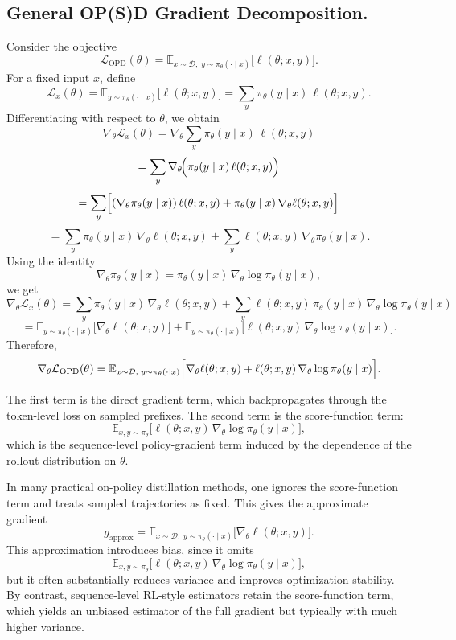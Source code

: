 \subsection{General OP(S)D Gradient Decomposition.} 
Consider the objective
\[
\mathcal{L}_{\mathrm{OPD}}(\theta)
=
\mathbb{E}_{x\sim \mathcal{D},\; y\sim \pi_\theta(\cdot\mid x)}
\bigl[\ell(\theta; x,y)\bigr].
\]
For a fixed input \(x\), define
\[
\mathcal{L}_x(\theta)
=
\mathbb{E}_{y\sim \pi_\theta(\cdot\mid x)}
\bigl[\ell(\theta; x,y)\bigr]
=
\sum_y \pi_\theta(y\mid x)\,\ell(\theta; x,y).
\]
Differentiating with respect to \(\theta\), we obtain
\[
\nabla_\theta \mathcal{L}_x(\theta)
=
\nabla_\theta \sum_y \pi_\theta(y\mid x)\,\ell(\theta; x,y)
\]
\[
=
\sum_y \nabla_\theta\!\Bigl(\pi_\theta(y\mid x)\,\ell(\theta; x,y)\Bigr)
\]
\[
=
\sum_y
\Bigl[
(\nabla_\theta \pi_\theta(y\mid x))\,\ell(\theta; x,y)
+
\pi_\theta(y\mid x)\,\nabla_\theta \ell(\theta; x,y)
\Bigr]
\]
\[
=
\sum_y \pi_\theta(y\mid x)\,\nabla_\theta \ell(\theta; x,y)
+
\sum_y \ell(\theta; x,y)\,\nabla_\theta \pi_\theta(y\mid x).
\]
Using the identity
\[
\nabla_\theta \pi_\theta(y\mid x)
=
\pi_\theta(y\mid x)\,\nabla_\theta \log \pi_\theta(y\mid x),
\]
we get
\[
\nabla_\theta \mathcal{L}_x(\theta)
=
\sum_y \pi_\theta(y\mid x)\,\nabla_\theta \ell(\theta; x,y)
+
\sum_y \ell(\theta; x,y)\,\pi_\theta(y\mid x)\,\nabla_\theta \log \pi_\theta(y\mid x)
\]
\[
=
\mathbb{E}_{y\sim \pi_\theta(\cdot\mid x)}
\bigl[\nabla_\theta \ell(\theta; x,y)\bigr]
+
\mathbb{E}_{y\sim \pi_\theta(\cdot\mid x)}
\bigl[\ell(\theta; x,y)\,\nabla_\theta \log \pi_\theta(y\mid x)\bigr].
\]
Therefore,
\[
\nabla_\theta \mathcal{L}_{\mathrm{OPD}}(\theta)
=
\mathbb{E}_{x\sim\mathcal D,\; y\sim \pi_\theta(\cdot\mid x)}
\Bigl[
\nabla_\theta \ell(\theta; x,y)
+
\ell(\theta; x,y)\,\nabla_\theta \log \pi_\theta(y\mid x)
\Bigr].
\]

The first term is the direct gradient term, which backpropagates
through the token-level loss on sampled prefixes. The second term is the
score-function term:
\[
\mathbb{E}_{x,y\sim\pi_\theta}
\bigl[
\ell(\theta; x,y)\,\nabla_\theta \log \pi_\theta(y\mid x)
\bigr],
\]
which is the sequence-level policy-gradient term induced by the dependence of
the rollout distribution on \(\theta\).

In many practical on-policy distillation methods, one ignores the score-function
term and treats sampled trajectories as fixed. This gives the approximate
gradient
\[
g_{\mathrm{approx}}
=
\mathbb{E}_{x\sim\mathcal D,\; y\sim \pi_\theta(\cdot\mid x)}
\bigl[
\nabla_\theta \ell(\theta; x,y)
\bigr].
\]
This approximation introduces bias, since it omits
\[
\mathbb{E}_{x,y\sim\pi_\theta}
\bigl[
\ell(\theta; x,y)\,\nabla_\theta \log \pi_\theta(y\mid x)
\bigr],
\]
but it often substantially reduces variance and improves optimization stability.
By contrast, sequence-level RL-style estimators retain the score-function term,
which yields an unbiased estimator of the full gradient but typically with much
higher variance.



